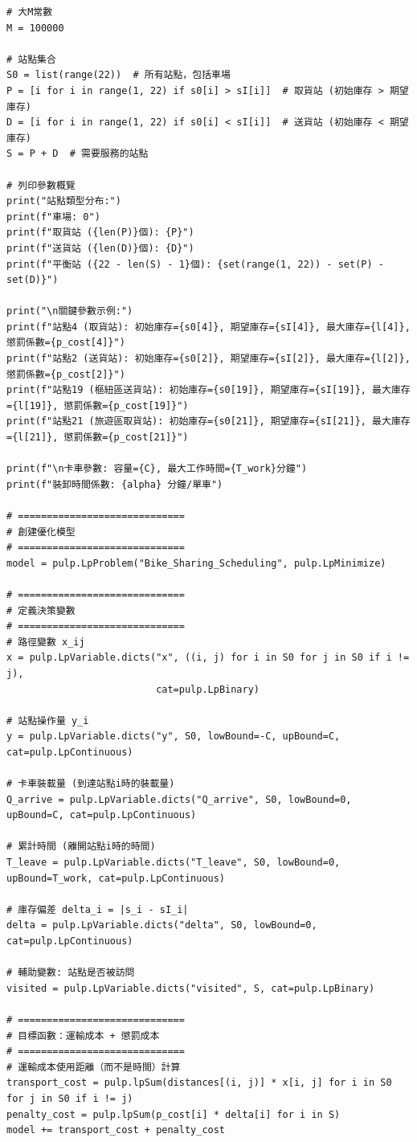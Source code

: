 \begin{verbatim}
# 大M常數
M = 100000

# 站點集合
S0 = list(range(22))  # 所有站點，包括車場
P = [i for i in range(1, 22) if s0[i] > sI[i]]  # 取貨站 (初始庫存 > 期望庫存)
D = [i for i in range(1, 22) if s0[i] < sI[i]]  # 送貨站 (初始庫存 < 期望庫存)
S = P + D  # 需要服務的站點

# 列印參數概覽
print("站點類型分布:")
print(f"車場: 0")
print(f"取貨站 ({len(P)}個): {P}")
print(f"送貨站 ({len(D)}個): {D}")
print(f"平衡站 ({22 - len(S) - 1}個): {set(range(1, 22)) - set(P) - set(D)}")

print("\n關鍵參數示例:")
print(f"站點4 (取貨站): 初始庫存={s0[4]}, 期望庫存={sI[4]}, 最大庫存={l[4]}, 懲罰係數={p_cost[4]}")
print(f"站點2 (送貨站): 初始庫存={s0[2]}, 期望庫存={sI[2]}, 最大庫存={l[2]}, 懲罰係數={p_cost[2]}")
print(f"站點19 (樞紐區送貨站): 初始庫存={s0[19]}, 期望庫存={sI[19]}, 最大庫存={l[19]}, 懲罰係數={p_cost[19]}")
print(f"站點21 (旅遊區取貨站): 初始庫存={s0[21]}, 期望庫存={sI[21]}, 最大庫存={l[21]}, 懲罰係數={p_cost[21]}")

print(f"\n卡車參數: 容量={C}, 最大工作時間={T_work}分鐘")
print(f"裝卸時間係數: {alpha} 分鐘/單車")

# =============================
# 創建優化模型
# =============================
model = pulp.LpProblem("Bike_Sharing_Scheduling", pulp.LpMinimize)

# =============================
# 定義決策變數
# =============================
# 路徑變數 x_ij
x = pulp.LpVariable.dicts("x", ((i, j) for i in S0 for j in S0 if i != j), 
                          cat=pulp.LpBinary)

# 站點操作量 y_i
y = pulp.LpVariable.dicts("y", S0, lowBound=-C, upBound=C, cat=pulp.LpContinuous)

# 卡車裝載量 (到達站點i時的裝載量)
Q_arrive = pulp.LpVariable.dicts("Q_arrive", S0, lowBound=0, upBound=C, cat=pulp.LpContinuous)

# 累計時間 (離開站點i時的時間)
T_leave = pulp.LpVariable.dicts("T_leave", S0, lowBound=0, upBound=T_work, cat=pulp.LpContinuous)

# 庫存偏差 delta_i = |s_i - sI_i|
delta = pulp.LpVariable.dicts("delta", S0, lowBound=0, cat=pulp.LpContinuous)

# 輔助變數: 站點是否被訪問
visited = pulp.LpVariable.dicts("visited", S, cat=pulp.LpBinary)

# =============================
# 目標函數：運輸成本 + 懲罰成本
# =============================
# 運輸成本使用距離（而不是時間）計算
transport_cost = pulp.lpSum(distances[(i, j)] * x[i, j] for i in S0 for j in S0 if i != j)
penalty_cost = pulp.lpSum(p_cost[i] * delta[i] for i in S)
model += transport_cost + penalty_cost


\end{verbatim}
